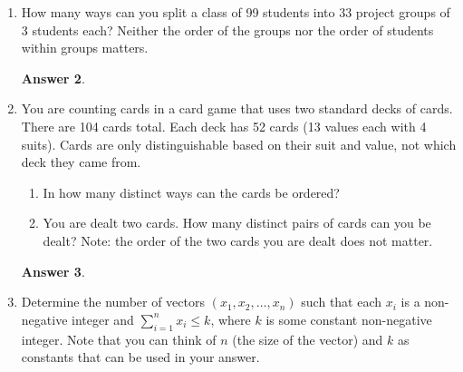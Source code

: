 \documentclass[12pt]{article}
\renewcommand{\(}{\left(}
\renewcommand{\)}{\right)}
\theoremstyle{definition}
\newtheorem*{answer}{Answer}
\begin{document}
\begin{enumerate}
\begin{enumerate}[label=\alph*.]
    \item an investment must be made in each company?
    \item investments must be made in at least 3 of the 4 companies?

    \end{enumerate}

    \begin{shaded}
    \begin{answer}

    \end{answer}
    \end{shaded}
    \newpage


\item How many ways can you split a class of 99 students into 33 project groups of 3 students each? Neither the order of the groups nor the order of students within groups matters.

    \begin{shaded}
    \begin{answer}

    \end{answer}
    \end{shaded}
    \newpage


\item You are counting cards in a card game that uses two standard decks of cards. There are 104
cards total. Each deck has 52 cards (13 values each with 4 suits). Cards are only
distinguishable based on their suit and value, not which deck they came from.
    \begin{enumerate}[label=\alph*.]

    \item In how many distinct ways can the cards be ordered?
    \item You are dealt two cards. How many distinct pairs of cards can you be dealt? Note: the
order of the two cards you are dealt does not matter.

    \end{enumerate}

    \begin{shaded}
    \begin{answer}

    \end{answer}
    \end{shaded}
    \newpage


\item Determine the number of vectors $(x_1, x_2, \dotsc, x_n)$ such that each $x_i$ is a non-negative integer and $\sum_{i=1}^n x_i \leq k$, where $k$ is some constant non-negative integer. Note that you can think of $n$ (the size of the vector) and $k$ as constants that can be used in your answer.


\end{enumerate}
\end{document}
